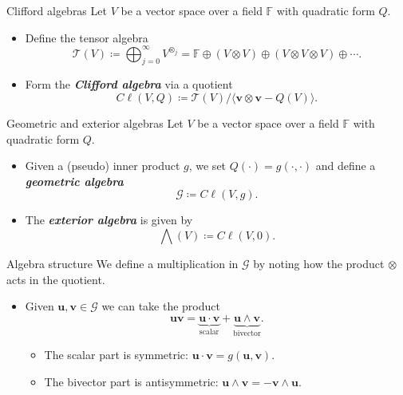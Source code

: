 \documentclass[aspectratio=169,handout]{beamer}
\newcommand\boldgreen[1]{\textcolor{lighter_csu_green}{\emph{\textbf{#1}}}}
\newcommand{\G}{\mathcal{G}}
\newcommand{\blade}[1]{\boldsymbol{#1}}
\begin{document}
\begin{frame}{Clifford algebras}
\vfill
Let $V$ be a vector space over a field $\mathbb{F}$ with quadratic form $Q$.
\begin{itemize}
    \pause
        \item Define the tensor algebra
        \[
        \mathcal{T}(V) \coloneqq \bigoplus_{j=0}^\infty V^{\otimes_j} = \mathbb{F} \oplus (V \otimes V) \oplus (V \otimes V \otimes V) \oplus \cdots.
        \]
    \pause
        \item Form the \boldgreen{Clifford algebra} via a quotient
        \[
        C\ell(V,Q) \coloneqq \mathcal{T}(V)/ \langle \blade{v} \otimes \blade{v} - Q(V)\rangle.
        \]
\end{itemize}
\vfill
\end{frame}

\begin{frame}{Geometric and exterior algebras}
\vfill
Let $V$ be a vector space over a field $\mathbb{F}$ with quadratic form $Q$.
\begin{itemize}
    \pause
        \item Given a (pseudo) inner product $g$, we set $Q(\cdot)=g(\cdot,\cdot)$ and define a \boldgreen{geometric algebra}
        \[
        \G \coloneqq C\ell(V,g).
        \]
    \pause
        \item The \boldgreen{exterior algebra} is given by
        \[
        \bigwedge(V) \coloneqq C\ell(V,0).
        \]
\end{itemize}
\vfill
\end{frame}

\begin{frame}{Algebra structure}
\vfill
We define a multiplication in $\G$ by noting how the product $\otimes$ acts in the quotient.
\begin{itemize}
\pause
    \item Given $\blade{u}, \blade{v} \in \G$ we can take the product
    \[
    \blade{u}\blade{v} = \underbrace{\blade{u}\cdot \blade{v}}_{\textrm{scalar}} + \underbrace{\blade{u}\wedge \blade{v}}_{\textrm{bivector}}.
    \]
\pause
\begin{itemize}
    \item The scalar part is symmetric: $\blade{u}\cdot \blade{v} = g(\blade{u},\blade{v})$.
\pause
    \item The bivector part is antisymmetric: $\blade{u}\wedge \blade{v} = -\blade{v}\wedge \blade{u}$.
\end{itemize}
\end{itemize}
\vfill
\end{frame}
\end{document}
